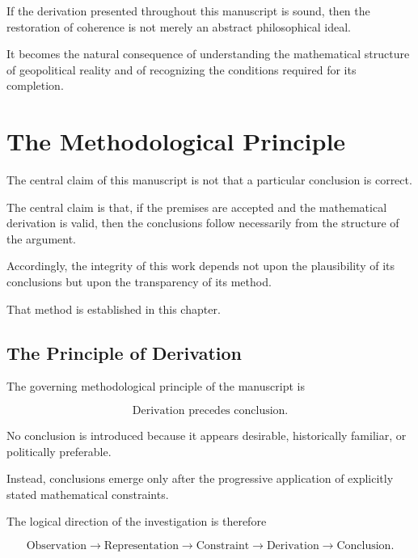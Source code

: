 \documentclass[11pt,openany]{book}
\theoremstyle{plain}
\theoremstyle{definition}
\begin{document}
If the derivation presented throughout this manuscript is sound, then the restoration of coherence is not merely an abstract philosophical ideal.

It becomes the natural consequence of understanding the mathematical structure of geopolitical reality and of recognizing the conditions required for its completion.

\chapter*{The Methodological Principle}


The central claim of this manuscript is not that a particular conclusion is correct.

The central claim is that, if the premises are accepted and the mathematical derivation is valid, then the conclusions follow necessarily from the structure of the argument.

Accordingly, the integrity of this work depends not upon the plausibility of its conclusions but upon the transparency of its method.

That method is established in this chapter.


\section*{The Principle of Derivation}

The governing methodological principle of the manuscript is

\[
\boxed{
\text{Derivation precedes conclusion.}
}
\]

No conclusion is introduced because it appears desirable, historically familiar, or politically preferable.

Instead, conclusions emerge only after the progressive application of explicitly stated mathematical constraints.

The logical direction of the investigation is therefore

\[
\boxed{
\text{Observation}
\longrightarrow
\text{Representation}
\longrightarrow
\text{Constraint}
\longrightarrow
\text{Derivation}
\longrightarrow
\text{Conclusion}.
}
\]
\end{document}
